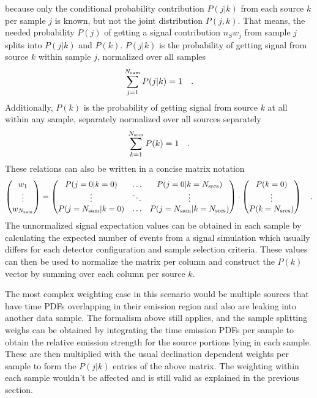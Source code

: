because only the conditional probability contribution $P(j|k)$ from each source $k$ per sample $j$ is known, but not the joint distribution $P(j,k)$.
That means, the needed probability $P(j)$ of getting a signal contribution $n_S w_j$ from sample $j$ splits into $P(j|k)$ and $P(k)$.
$P(j|k)$ is the probability of getting signal from source $k$ within sample $j$, normalized over all samples
\begin{equation}
  \sum_{j=1}^{N_\text{sam}} P(j|k) = 1
  \quad\text{.}
\end{equation}
Additionally, $P(k)$ is the probability of getting signal from source $k$ at all within any sample, separately normalized over all sources separately
\begin{equation}
  \sum_{k=1}^{N_\text{srcs}} P(k) = 1
  \quad\text{.}
\end{equation}
These relations can also be written in a concise matrix notation
\begin{equation}
  \begin{pmatrix} w_1 \\ \vdots \\ w_{N_\text{sam}} \end{pmatrix} =
    \begin{pmatrix}
      P(j=0|k=0) & \dots & P(j=0|k=N_\text{srcs}) \\
      \vdots & \ddots & \vdots \\
      P(j=N_\text{sam}|k=0) & \dots & P(j=N_\text{sam}|k=N_\text{srcs})
    \end{pmatrix} \cdot
    \begin{pmatrix}
      P(k=0) \\ \vdots \\ P(k=N_\text{srcs})
    \end{pmatrix}
  \quad\text{.}
\end{equation}
The unnormalized signal expectation values can be obtained in each sample by calculating the expected number of events from a signal simulation which usually differs for each detector configuration and sample selection criteria.
These values can then be used to normalize the matrix per column and construct the $P(k)$ vector by summing over each column per source $k$.

The most complex weighting case in this scenario would be multiple sources that have time PDFs overlapping in their emission region and also are leaking into another data sample.
The formalism above still applies, and the sample splitting weighs can be obtained by integrating the time emission PDFs per sample to obtain the relative emission strength for the source portions lying in each sample.
These are then multiplied with the usual declination dependent weights per sample to form the $P(j|k)$ entries of the above matrix.
The weighting within each sample wouldn't be affected and is still valid as explained in the previous section.

